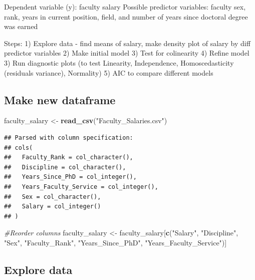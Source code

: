 \documentclass[]{article}
\newenvironment{Shaded}{\begin{snugshade}}{\end{snugshade}}
\newcommand{\KeywordTok}[1]{\textcolor[rgb]{0.13,0.29,0.53}{\textbf{#1}}}
\newcommand{\StringTok}[1]{\textcolor[rgb]{0.31,0.60,0.02}{#1}}
\newcommand{\CommentTok}[1]{\textcolor[rgb]{0.56,0.35,0.01}{\textit{#1}}}
\newcommand{\NormalTok}[1]{#1}
\begin{document}
Dependent variable (y): faculty salary Possible predictor variables:
faculty sex, rank, years in current position, field, and number of years
since doctoral degree was earned

Steps: 1) Explore data - find means of salary, make density plot of
salary by diff predictor variables 2) Make initial model 3) Test for
colinearity 4) Refine model 3) Run diagnostic plots (to test Linearity,
Independence, Homoscedasticity (residuals variance), Normality) 5) AIC
to compare different models

\subsection{Make new dataframe}\label{make-new-dataframe}

\begin{Shaded}
\begin{Highlighting}[]
\NormalTok{faculty_salary <-}\StringTok{ }\KeywordTok{read_csv}\NormalTok{(}\StringTok{"Faculty_Salaries.csv"}\NormalTok{)}
\end{Highlighting}
\end{Shaded}

\begin{verbatim}
## Parsed with column specification:
## cols(
##   Faculty_Rank = col_character(),
##   Discipline = col_character(),
##   Years_Since_PhD = col_integer(),
##   Years_Faculty_Service = col_integer(),
##   Sex = col_character(),
##   Salary = col_integer()
## )
\end{verbatim}

\begin{Shaded}
\begin{Highlighting}[]
\CommentTok{#Reorder columns}
\NormalTok{faculty_salary <-}\StringTok{ }\NormalTok{faculty_salary[}\KeywordTok{c}\NormalTok{(}\StringTok{"Salary"}\NormalTok{, }\StringTok{"Discipline"}\NormalTok{, }\StringTok{"Sex"}\NormalTok{, }\StringTok{"Faculty_Rank"}\NormalTok{, }\StringTok{"Years_Since_PhD"}\NormalTok{, }\StringTok{"Years_Faculty_Service"}\NormalTok{)]}
\end{Highlighting}
\end{Shaded}

\subsection{Explore data}\label{explore-data}
\end{document}
